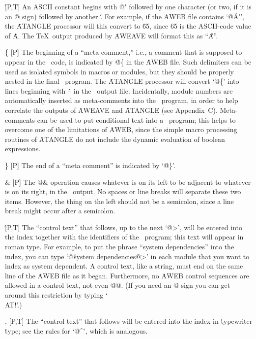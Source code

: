 \@\' [P,T] An ASCII constant begins with \.{@\'} followed by one character
(or two, if it is an \.@ sign) followed by another \.\'. For example, if
the \.{AWEB} file contains `\.{@\'A\'}', the \.{ATANGLE} processor will
this convert to \.{65}, since 65 is the ASCII-code value of \.{A}. The
\TeX\ output produced by \.{AWEAVE} will format this as ``\H{A}''.

\@\{ [P] The beginning of a ``meta comment,'' i.e., a comment
that is supposed to appear in the \ADA\ code, is indicated by
\.{@\{} in the \.{AWEB} file. Such delimiters can be used as
isolated symbols in macros or modules, but they should be properly nested
in the final \ADA\ program. The \.{ATANGLE} processor will convert
`\.{@\{}' into lines beginning with \.{--} in the \ADA\ output file.
Incidentally, module numbers are automatically inserted
as meta-comments into the \ADA\ program, in order to help correlate the
outputs of \.{AWEAVE} and \.{ATANGLE} (see Appendix~C\null). Meta-comments
can be used to put conditional text into a \ADA\ program; this helps to
overcome one of the limitations of \.{AWEB}, since the simple macro
processing routines of \.{ATANGLE} do not include the dynamic evaluation of
boolean expressions.
 
\@\} [P] The end of a ``meta comment'' is indicated by `\.{@\}}'.
 
\@\& [P] The \.{@\&} operation causes whatever is on its left to be
adjacent to whatever is on its right, in the \ADA\ output. No spaces or
line breaks will separate these two items. However, the thing on the left
should not be a semicolon, since a line break might occur after a semicolon.
 
\@\^ [P,T] The ``control text'' that follows, up to the next
`\.{@>}', will be entered into the index together with the identifiers of
the \ADA\ program; this text will appear in roman type. For example, to
put the phrase ``system dependencies'' into the index, you can type
`\.{@\^system dependencies@>}' in each module
that you want to index as system dependent. A control text, like a string,
must end on the same line of the \.{AWEB} file as it began.  Furthermore,
no \.{AWEB} control sequences are allowed in a control text, not even
\.{@@}. (If you need an \.{@} sign you can get around this restriction by
typing `\.{\\AT!}'.)
 
\@. [P,T] The ``control text'' that follows will be entered into the index
in \.{typewriter} \.{type}; see the rules for `\.{@\^}', which is analogous.
 

